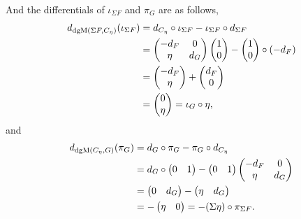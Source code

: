 \begin{remark}
    And the differentials of \( \iota_{\Sigma F} \) and \( \pi_G \) are as follows,
    \begin{align*}
        d_{\operatorname{dgM}(\Sigma F, C_{\eta})}(\iota_{\Sigma F}) &= d_{C_{\eta}} \circ \iota_{\Sigma F} - \iota_{\Sigma F} \circ d_{\Sigma F} \\
        &=
        \begin{pmatrix}
            -d_F & 0 \\
            \eta & d_G
        \end{pmatrix}
        \begin{pmatrix}
            1 \\
            0
        \end{pmatrix}
        -
        \begin{pmatrix}
            1 \\
            0
        \end{pmatrix}
        \circ (- d_F) \\
        &=
        \begin{pmatrix}
            -d_F \\
            \eta
        \end{pmatrix}
        +
        \begin{pmatrix}
            d_F \\
            0
        \end{pmatrix} \\
        &=
        \begin{pmatrix}
            0 \\
            \eta
        \end{pmatrix}
        = \iota_G \circ \eta,
    \end{align*}
    and
    \begin{align*}
        d_{\operatorname{dgM}(C_{\eta}, G)}(\pi_G) &= d_G \circ \pi_G - \pi_G \circ d_{C_{\eta}} \\
        &= d_G \circ
        \begin{pmatrix}
            0 & 1
        \end{pmatrix}
        -
        \begin{pmatrix}
            0 & 1
        \end{pmatrix}
        \begin{pmatrix}
            -d_F & 0 \\
            \eta & d_G
        \end{pmatrix} \\
        &=
        \begin{pmatrix}
            0 & d_G
        \end{pmatrix}
        -
        \begin{pmatrix}
            \eta & d_G
        \end{pmatrix} \\
        &= -
        \begin{pmatrix}
            \eta & 0
        \end{pmatrix}
        = - (\Sigma \eta) \circ \pi_{\Sigma F}.
    \end{align*}
\end{remark}

